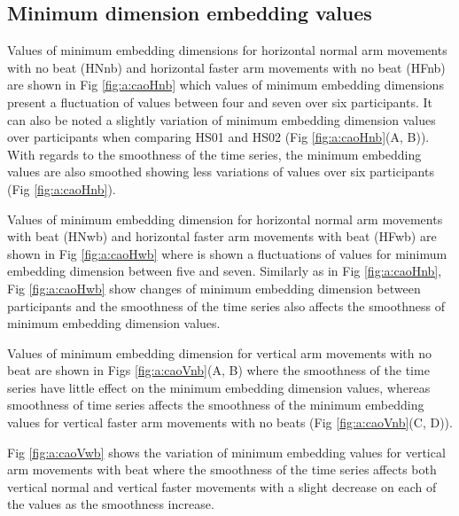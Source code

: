 \subsection{Minimum dimension embedding values}
Values of minimum embedding dimensions for horizontal normal arm movements 
with no beat (HNnb) and horizontal faster arm movements 
with no beat (HFnb) are shown in Fig \ref{fig:a:caoHnb} which values of 
minimum embedding dimensions present a fluctuation of values between four 
and seven over six participants.
It can also be noted a slightly variation of minimum embedding dimension values 
over participants when comparing HS01 and HS02 (Fig \ref{fig:a:caoHnb}(A, B)).
With regards to the smoothness of the time series,
the minimum embedding values are also smoothed showing less variations of
values over six participants (Fig \ref{fig:a:caoHnb}).

Values of minimum embedding dimension for horizontal normal arm movements 
with beat (HNwb) and horizontal faster arm movements with beat (HFwb) 
are shown in Fig \ref{fig:a:caoHwb} where is shown a fluctuations of values
for minimum embedding dimension between five and seven.
Similarly as in Fig \ref{fig:a:caoHnb}, Fig \ref{fig:a:caoHwb} show changes of 
minimum embedding dimension between participants and the smoothness of the 
time series also affects the smoothness of minimum embedding dimension values.


Values of minimum embedding dimension for vertical arm movements with no beat
are shown in Figs \ref{fig:a:caoVnb}(A, B) where the smoothness 
of the time series have little effect on the minimum embedding dimension 
values, whereas smoothness of time series affects the smoothness of the 
minimum embedding values for vertical faster arm movements with no beats 
(Fig \ref{fig:a:caoVnb}(C, D)).

Fig \ref{fig:a:caoVwb} shows the variation of minimum embedding values for 
vertical arm movements with beat where the smoothness of the time series
affects both vertical normal and vertical faster movements with a slight 
decrease on each of the values as the smoothness increase.




